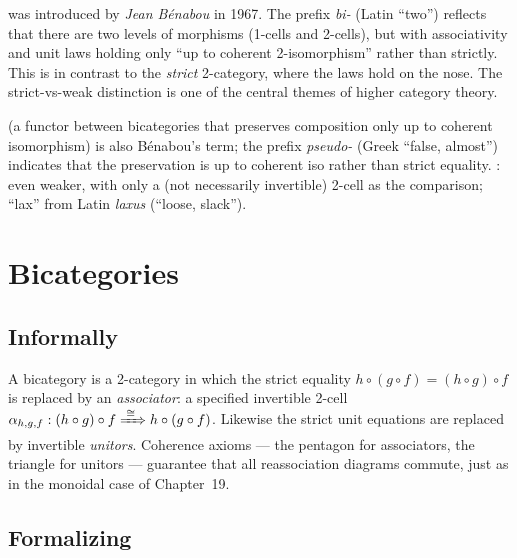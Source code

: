 \begin{nameorigin}
 was introduced by \emph{Jean Bénabou} in 1967. The
prefix \emph{bi-} (Latin ``two'') reflects that there are two levels of
morphisms (1-cells and 2-cells), but with associativity and unit laws
holding only ``up to coherent 2-isomorphism'' rather than strictly.
This is in contrast to the \emph{strict} 2-category, where the laws
hold on the nose. The strict-vs-weak distinction is one of the central
themes of higher category theory.

 (a functor between bicategories that preserves
composition only up to coherent isomorphism) is also Bénabou's term;
the prefix \emph{pseudo-} (Greek ``false, almost'') indicates that the
preservation is up to coherent iso rather than strict equality.
: even weaker, with only a (not necessarily
invertible) 2-cell as the comparison; ``lax'' from Latin
\emph{laxus} (``loose, slack'').
\end{nameorigin}

\section{Bicategories}
\label{sec:bicategories-formal}

\subsection{Informally}

A bicategory is a 2-category in which the strict equality
$h \circ (g \circ f) = (h \circ g) \circ f$ is replaced by an
\emph{associator}: a specified invertible 2-cell
$\alpha_{h,g,f} : (h \circ g) \circ f \xRightarrow{\;\cong\;} h \circ (g \circ f)$.
Likewise the strict unit equations are replaced by invertible \emph{unitors}.
Coherence axioms — the pentagon for associators, the triangle for unitors —
guarantee that all reassociation diagrams commute, just as in the monoidal
case of Chapter~19.

\subsection{Formalizing}

